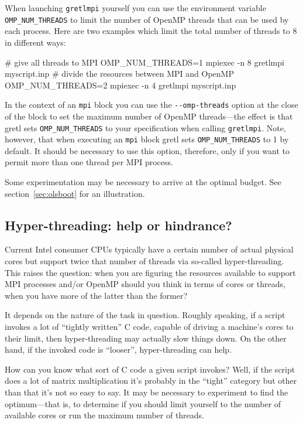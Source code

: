 \documentclass{article}
\begin{document}
When launching \texttt{gretlmpi} yourself you can use the environment
variable \verb|OMP_NUM_THREADS| to limit the number of \textsf{OpenMP}
threads that can be used by each process. Here are two examples which
limit the total number of threads to 8 in different ways:
\begin{code}
# give all threads to MPI
OMP_NUM_THREADS=1 mpiexec -n 8 gretlmpi myscript.inp
# divide the resources between MPI and OpenMP
OMP_NUM_THREADS=2 mpiexec -n 4 gretlmpi myscript.inp
\end{code}

In the context of an \texttt{mpi} block you can use the
\verb|--omp-threads| option at the close of the block to set the
maximum number of \textsf{OpenMP} threads---the effect is that gretl
sets \verb|OMP_NUM_THREADS| to your specification when calling
\texttt{gretlmpi}. Note, however, that when executing an
\texttt{mpi} block gretl sets \verb|OMP_NUM_THREADS| to 1 by
default. It should be necessary to use this option, therefore, only if
you want to permit more than one thread per MPI process.

Some experimentation may be necessary to arrive at the optimal budget.
See section~\ref{sec:olsboot} for an illustration.

\subsection{Hyper-threading: help or hindrance?}
\label{sec:hyper}

Current Intel consumer CPUs typically have a certain number of actual
physical cores but support twice that number of threads via so-called
hyper-threading. This raises the question: when you are figuring the
resources available to support MPI processes and/or \textsf{OpenMP}
should you think in terms of cores or threads, when you have more of
the latter than the former?

It depends on the nature of the task in question. Roughly speaking, if
a script invokes a lot of ``tightly written'' C code, capable of
driving a machine's cores to their limit, then hyper-threading may
actually slow things down. On the other hand, if the invoked code is
``looser'', hyper-threading can help.

How can you know what sort of C code a given script invokes? Well, if
the script does a lot of matrix multiplication it's probably in the
``tight'' category but other than that it's not so easy to say.  It
may be necessary to experiment to find the optimum---that is, to
determine if you should limit yourself to the number of available
cores or run the maximum number of threads.
\end{document}
